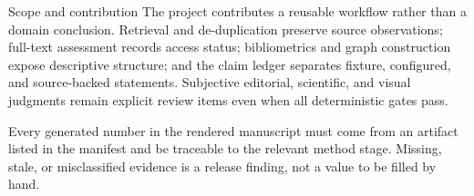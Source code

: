 \documentclass[
  ignorenonframetext,
]{beamer}
\begin{document}
\begin{frame}[allowframebreaks]{Scope and contribution}
\label{scope-and-contribution}
The project contributes a reusable workflow rather than a domain
conclusion. Retrieval and de-duplication preserve source observations;
full-text assessment records access status; bibliometrics and graph
construction expose descriptive structure; and the claim ledger
separates fixture, configured, and source-backed statements. Subjective
editorial, scientific, and visual judgments remain explicit review items
even when all deterministic gates pass.

Every generated number in the rendered manuscript must come from an
artifact listed in the manifest and be traceable to the relevant method
stage. Missing, stale, or misclassified evidence is a release finding,
not a value to be filled by hand.
\end{frame}
\end{document}
